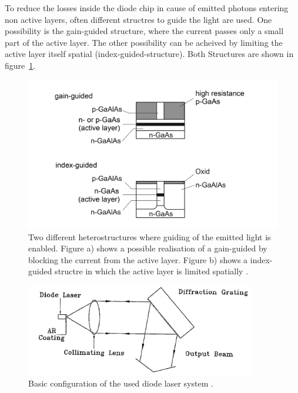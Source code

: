 To reduce the losses inside the diode chip in cause of emitted photons entering
non active layers, often different structres to guide the light are used.
One possibility is the gain-guided structure, where the current passes only a
small part of the active layer. The other possibility can be acheived by limiting
the active layer itself spatial (index-guided-structure). Both Structures are
shown in figure~\ref{fig:guided}.
\begin{figure}
  \centering
  \includegraphics[width = \textwidth]{Pics/guided.png}
  \caption{Two different heterostructures where guiding of the emitted light is
  enabled. Figure a) shows a possible realisation of a gain-guided by blocking
  the current from the active layer. Figure b) shows a index-guided structre in
  which the active layer is limited spatially \cite{Eichler}. }
  \label{fig:guided}
\end{figure}
\begin{figure}
  \centering
  \includegraphics[width = 0.9\textwidth]{Pics/setup.png}
  \caption{Basic configuration of the used diode laser system \cite{anleitung}.}
  \label{fig:setup}
\end{figure}

